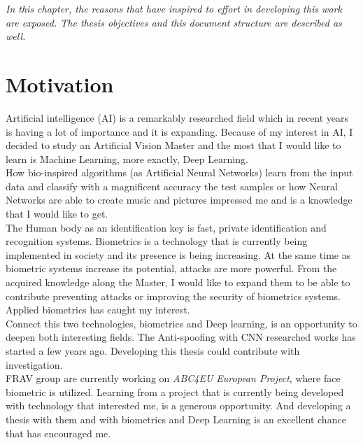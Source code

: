 
\begin{small}
\emph{In this chapter, the reasons that have inspired to effort in developing this work are exposed. The thesis objectives and this document structure are described as well.\\}
\end{small}
\section{Motivation}
Artificial intelligence (AI) is a remarkably researched field which in recent years is having a lot of importance and it is expanding. Because of my interest in AI,  I decided to study an Artificial Vision Master and the most that I would like to learn is Machine Learning, more exactly, Deep Learning.\\

How bio-inspired algorithms (as Artificial Neural Networks) learn from the input data and classify with a magnificent accuracy the test samples or how Neural Networks are able to create music and pictures impressed me and is a knowledge that I would like to get.\\

The Human body as an identification key is fast, private identification and recognition systems. Biometrics is a technology that is currently being implemented in society and its presence is being increasing. At the same time as biometric systems increase its potential, attacks are more powerful. From the acquired knowledge along the Master, I would like to expand them to be able to contribute preventing attacks or improving the security of biometrics systems. Applied biometrics has caught my interest. \\

Connect this two technologies, biometrics and Deep learning, is an opportunity to deepen both interesting fields. The Anti-spoofing with CNN researched works has started a few years ago. Developing this thesis could contribute with investigation.\\

FRAV group are currently working on \textit{ABC4EU European Project}, where face biometric is utilized. Learning from a project that is currently being developed with technology that interested me, is a generous opportunity. And developing a thesis with them and with biometrics and Deep Learning is an excellent chance that has encouraged me.\\

